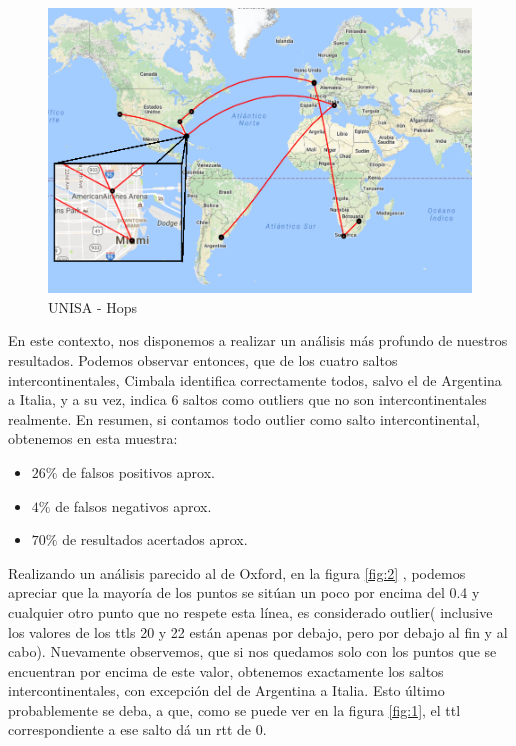 \newpage

\begin{figure}[!htbp]
  \centering
    \includegraphics[scale=0.6]{imagenes/unisa-graficos/mapa-unisa.png}
  \caption{UNISA - Hops}
  \label{mapa-unisa}
\end{figure}

En este contexto, nos disponemos a realizar un análisis más profundo de nuestros resultados. Podemos observar entonces, que de los cuatro saltos intercontinentales, Cimbala identifica correctamente todos, salvo el de Argentina a Italia, y a su vez, indica 6 saltos como outliers que no son intercontinentales realmente. En resumen, si contamos todo outlier como salto intercontinental, obtenemos en esta muestra:

\begin{itemize}
	\item $26 \% $ de falsos positivos aprox.
	\item $4 \%$ de falsos negativos aprox.
	\item $70 \%$ de resultados acertados aprox.
\end{itemize}

Realizando un análisis parecido al de Oxford, en la figura \ref{fig:2} , podemos apreciar que la mayoría de los puntos se sitúan un poco por encima del 0.4 y cualquier otro punto que no respete esta línea, es considerado outlier( inclusive los valores de los ttls 20 y 22 están apenas por debajo, pero por debajo al fin y al cabo). Nuevamente observemos, que si nos quedamos solo con los puntos que se encuentran por encima de este valor, obtenemos exactamente los saltos intercontinentales, con excepción del de Argentina a Italia. Esto último probablemente se deba, a que, como se puede ver en la figura \ref{fig:1}, el ttl correspondiente a ese salto dá un rtt de 0.

